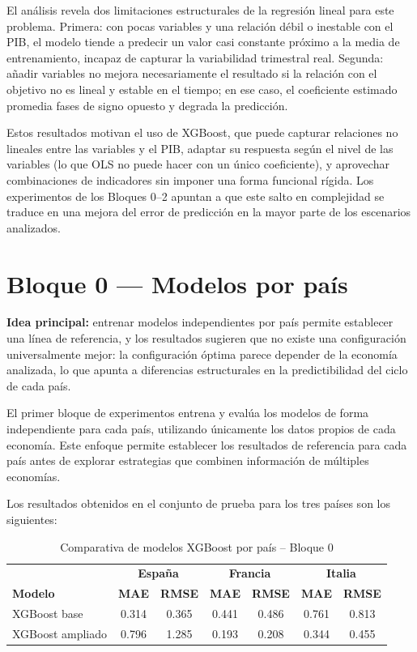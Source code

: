 El análisis revela dos limitaciones estructurales de la regresión lineal para este problema.
Primera: con pocas variables y una relación débil o inestable con el PIB, el modelo tiende
a predecir un valor casi constante próximo a la media de entrenamiento, incapaz de capturar
la variabilidad trimestral real. Segunda: añadir variables no mejora necesariamente el
resultado si la relación con el objetivo no es lineal y estable en el tiempo; en ese caso,
el coeficiente estimado promedia fases de signo opuesto y degrada la predicción.

Estos resultados motivan el uso de XGBoost, que puede capturar relaciones no lineales entre
las variables y el PIB, adaptar su respuesta según el nivel de las variables (lo que OLS
no puede hacer con un único coeficiente), y aprovechar combinaciones de indicadores sin
imponer una forma funcional rígida. Los experimentos de los Bloques 0--2 apuntan a que
este salto en complejidad se traduce en una mejora del error de predicción en la mayor parte de los escenarios analizados.

\FloatBarrier
\section{Bloque 0 --- Modelos por país}

\textbf{Idea principal:} entrenar modelos independientes por país permite establecer una línea de referencia, y los resultados sugieren que no existe una configuración universalmente mejor: la configuración óptima parece depender de la economía analizada, lo que apunta a diferencias estructurales en la predictibilidad del ciclo de cada país.

El primer bloque de experimentos entrena y evalúa los modelos de forma independiente para cada país, utilizando únicamente los datos propios de cada economía. Este enfoque permite establecer los resultados de referencia para cada país antes de explorar estrategias que combinen información de múltiples economías.

Los resultados obtenidos en el conjunto de prueba para los tres países son los siguientes:

\begin{table}[H]
\centering
\caption{Comparativa de modelos XGBoost por país -- Bloque 0}
\label{tab:bloque0}
\small
\begin{tabular}{lcccccc}
\hline
 & \multicolumn{2}{c}{\textbf{España}} & \multicolumn{2}{c}{\textbf{Francia}} & \multicolumn{2}{c}{\textbf{Italia}} \\
\textbf{Modelo} & \textbf{MAE} & \textbf{RMSE} & \textbf{MAE} & \textbf{RMSE} & \textbf{MAE} & \textbf{RMSE} \\
\hline
XGBoost base     & 0.314 & 0.365 & 0.441 & 0.486 & 0.761 & 0.813 \\
XGBoost ampliado & 0.796 & 1.285 & 0.193 & 0.208 & 0.344 & 0.455 \\
\hline
\end{tabular}
\end{table}

